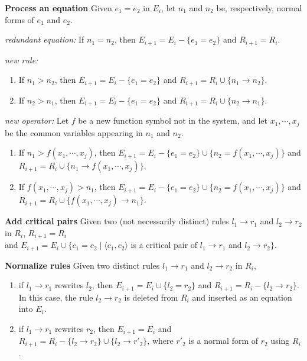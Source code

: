 \begin{description}
\item{\bf Process an equation}
Given $e_1 = e_2$ in $E_i$, let $n_1$ and $n_2$ be, respectively,
normal forms of $e_1$ and $e_2$.
\begin{description}
\item{\em redundant equation:}
If $n_1 = n_2$, then $E_{i+1} = E_i - \{ e_1 = e_2 \}$ and
$R_{i+1} = R_i$.
\item{\em new rule:}
\begin{enumerate}
\item If $n_1 > n_2$, then  $E_{i+1} = E_i - \{ 
e_1 = e_2 \}$ and $R_{i+1} = R_i \cup \{ n_1 \rightarrow n_2 \}$.
\item If $n_2 > n_1$, then  $E_{i+1} = E_i - \{ 
e_1 = e_2 \}$ and $R_{i+1} = R_i \cup \{ n_2 \rightarrow n_1\}$.
\end{enumerate}

\item{\em new operator:} 
Let $f$ be a new function symbol not in the system, and let $x_1,
\cdots , x_j$ be the common variables appearing in $n_1$ and
$n_2$.
\begin{enumerate}
\item If $n_1 > f(x_1, \cdots , x_j)$, then  $E_{i+1} = E_i - \{ 
e_1 = e_2 \} \cup \{n_2 = f(x_1, \cdots , x_j) \}$ and \\
$R_{i+1} = R_i
\cup \{ n_1 \rightarrow f(x_1, \cdots, x_j)\}$.
\item If $f(x_1, \cdots , x_j) > n_1$, then  $E_{i+1} = E_i - \{ 
e_1 = e_2 \} \cup \{n_2 = f(x_1, \cdots , x_j) \}$ and \\
$R_{i+1} = R_i
\cup \{ f(x_1, \cdots, x_j) \rightarrow n_1 \}$.
\end{enumerate}
\end{description}

\item{\bf Add critical pairs}
Given two (not necessarily distinct) rules $l_1 \rightarrow r_1$
and $l_2 \rightarrow r_2$ in $R_i$, $R_{i+1} = R_i$\\
\hspace*{1.0in}and $E_{i+1} = E_i \cup
\{ c_1 = c_2 \mid \langle c_1, c_2\rangle$ is a critical pair of $l_1 \rightarrow r_1$
and $l_2 \rightarrow r_2 \}$.

\item{\bf Normalize rules}
Given two distinct rules $l_1 \rightarrow r_1$ and $l_2
\rightarrow r_2$ in $R_i$,
\begin{enumerate}
\item if $l_1 \rightarrow r_1$ rewrites $l_2$, then $E_{i+1} = E_i \cup
\{ l_2 = r_2 \}$ and $R_{i+1} = R_i - \{ l_2 \rightarrow r_2 \}$.
In this case, the rule $l_2 \rightarrow r_2$ is deleted from
$R_i$ and inserted as an equation into $E_i$.
\item if $l_1 \rightarrow r_1$ rewrites $r_2$, then $E_{i+1} = E_i$
and $R_{i+1} = R_i - \{ l_2 \rightarrow r_2 \} \cup \{ l_2
\rightarrow r'_2 \} $, where $r'_2$ is a normal form of $r_2$
using $R_i$.
\end{enumerate}
\end{description}
